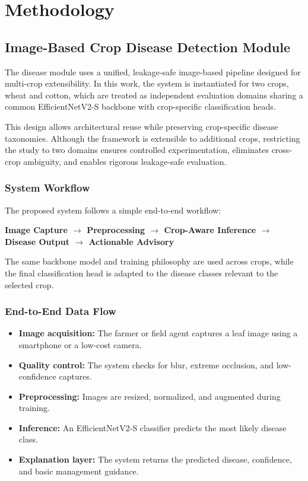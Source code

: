 \documentclass[12pt,a4paper]{report}
\begin{document}
\section{Methodology}

\subsection{Image-Based Crop Disease Detection Module}
The disease module uses a unified, leakage-safe image-based pipeline designed for multi-crop extensibility. In this work, the system is instantiated for two crops, wheat and cotton, which are treated as independent evaluation domains sharing a common EfficientNetV2-S backbone with crop-specific classification heads.

This design allows architectural reuse while preserving crop-specific disease taxonomies. Although the framework is extensible to additional crops, restricting the study to two domains ensures controlled experimentation, eliminates cross-crop ambiguity, and enables rigorous leakage-safe evaluation.

\subsubsection{System Workflow}
The proposed system follows a simple end-to-end workflow:
\begin{center}
\textbf{Image Capture $\rightarrow$ Preprocessing $\rightarrow$ Crop-Aware Inference $\rightarrow$ Disease Output $\rightarrow$ Actionable Advisory}
\end{center}
The same backbone model and training philosophy are used across crops, while the final classification head is adapted to the disease classes relevant to the selected crop.

\subsubsection{End-to-End Data Flow}
\begin{itemize}
\item \textbf{Image acquisition:} The farmer or field agent captures a leaf image using a smartphone or a low-cost camera.
\item \textbf{Quality control:} The system checks for blur, extreme occlusion, and low-confidence captures.
\item \textbf{Preprocessing:} Images are resized, normalized, and augmented during training.
\item \textbf{Inference:} An EfficientNetV2-S classifier predicts the most likely disease class.
\item \textbf{Explanation layer:} The system returns the predicted disease, confidence, and basic management guidance.
\end{itemize}
\end{document}
